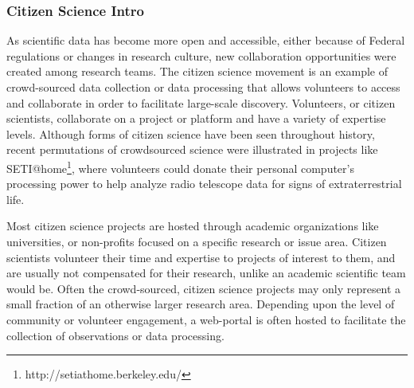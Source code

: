 \subsubsection{Citizen Science Intro}

As scientific data has become more open and accessible, either because of Federal regulations or changes in research culture, new collaboration opportunities were created among research teams. The citizen science movement is an example of crowd-sourced data collection or data processing that allows volunteers to access and collaborate in order to facilitate large-scale discovery. Volunteers, or citizen scientists, collaborate on a project or platform and have a variety of expertise levels. Although forms of citizen science have been seen throughout history, recent permutations of crowdsourced science were illustrated in projects like SETI@home\footnote{http://setiathome.berkeley.edu/}, where volunteers could donate their personal computer's processing power to help analyze radio telescope data for signs of extraterrestrial life. 

Most citizen science projects are hosted through academic organizations like universities, or non-profits focused on a specific research or issue area. Citizen scientists volunteer their time and expertise to projects of interest to them, and are usually not compensated for their research, unlike an academic scientific team would be. Often the crowd-sourced, citizen science projects may only represent a small fraction of an otherwise larger research area. Depending upon the level of community or volunteer engagement, a web-portal is often hosted to facilitate the collection of observations or data processing.
